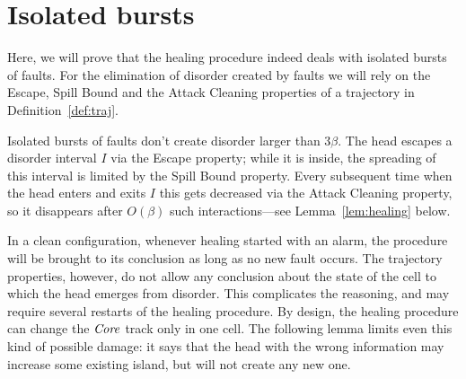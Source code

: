 \documentclass[11pt]{memoir}
\theoremstyle{definition} %
\newcommand{\fld}[1]{\ensuremath{\textit{#1\/}}}
\def\B{B}
\newcommand{\Tu}{T}
\newcommand{\Z}{Z} %
\newcommand{\Core}{\fld{Core}}
\newcommand{\cns}[1]{c_{\textrm{\upshape #1}}}
\newcommand{\CEsc}{\cns{esc}}
\newcommand{\CMarg}{\cns{marg}}
\newcommand{\CSpill}{\cns{spill}}
\begin{document}
\section{Isolated bursts}\label{sec:1-level-noise}

Here, we will prove that the healing procedure indeed deals with isolated bursts of faults.
For the elimination of disorder created by faults
we will rely on the Escape, Spill Bound and the Attack Cleaning
properties of a trajectory in Definition~\ref{def:traj}.

Isolated bursts of faults don't create disorder larger than \( 3\beta \).
The head escapes a disorder interval \( I \) via the Escape property; while it is inside, the
spreading of this interval is limited by the Spill Bound property.
Every subsequent time when the head enters and exits \( I \) this gets decreased
via the Attack Cleaning property, so it disappears after \( O(\beta) \) such interactions---see
Lemma~\ref{lem:healing} below.

 
In a clean configuration, whenever healing started with an alarm, the procedure
will be brought to its conclusion as long as no new fault occurs.
The trajectory properties, however, do not allow any conclusion about the
state of the cell to which the head emerges from disorder.
This complicates the reasoning, and may require several restarts of the healing procedure.
By design, the healing procedure can change the \( \Core \) track only in one cell.
The following lemma limits even this kind of possible damage:
it says that the head with the wrong information may increase some existing island, but will
not create any new one.
\end{document}
